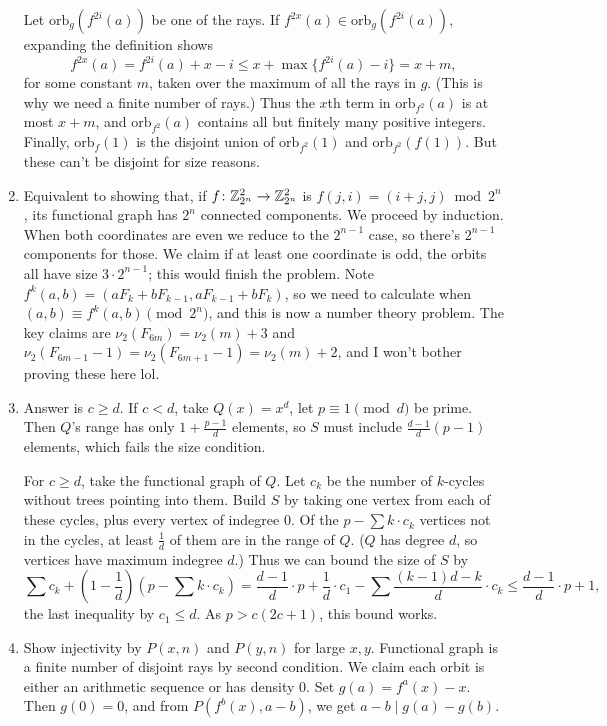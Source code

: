 \documentclass[11pt,paper=letter]{scrartcl}
\newcommand{\orbf}[2]{\mathrm{orb}_{#1}(#2)}
\begin{document}
\begin{enumerate}
Let $\orbf{g}{f^{2i}(a)}$ be one of the rays. If $f^{2x}(a) \in \orbf{g}{f^{2i}(a)}$, expanding the definition shows \[
  f^{2x}(a) = f^{2i}(a) + x - i \le x + \max\{f^{2i}(a) - i\} = x + m,
\]
for some constant $m$, taken over the maximum of all the rays in $g$. (This is why we need a finite number of rays.) Thus the $x$th term in $\orbf{f^2}{a}$ is at most $x + m$, and $\orbf{f^2}{a}$ contains all but finitely many positive integers. Finally, $\orbf{f}{1}$ is the disjoint union of $\orbf{f^2}{1}$ and $\orbf{f^2}{f(1)}$. But these can't be disjoint for size reasons.

\item Equivalent to showing that, if $f \colon \mathbb Z_{2^n}^2 \to \mathbb Z_{2^n}^2$ is $f(j, i) = (i + j, j) \bmod 2^n$, its functional graph has $2^n$ connected components. We proceed by induction. When both coordinates are even we reduce to the $2^{n-1}$ case, so there's $2^{n-1}$ components for those. We claim if at least one coordinate is odd, the orbits all have size $3 \cdot 2^{n-1}$; this would finish the problem. Note $f^k(a, b) = (aF_k + bF_{k-1}, aF_{k-1} + bF_k)$, so we need to calculate when $(a, b) \equiv f^k(a, b) \pmod{2^n}$, and this is now a number theory problem. The key claims are $\nu_2(F_{6m}) = \nu_2(m) + 3$ and $\nu_2(F_{6m-1} - 1) = \nu_2(F_{6m+1} - 1) = \nu_2(m) + 2$, and I won't bother proving these here lol.

\item Answer is $c \ge d$. If $c < d$, take $Q(x) = x^d$, let $p \equiv 1 \pmod d$ be prime. Then $Q$'s range has only $1 + \frac{p-1}{d}$ elements, so $S$ must include $\frac{d-1}{d}(p - 1)$ elements, which fails the size condition.

For $c \ge d$, take the functional graph of $Q$. Let $c_k$ be the number of $k$-cycles without trees pointing into them. Build $S$ by taking one vertex from each of these cycles, plus every vertex of indegree $0$. Of the $p - \sum k \cdot c_k$ vertices not in the cycles, at least $\frac{1}{d}$ of them are in the range of $Q$. ($Q$ has degree $d$, so vertices have maximum indegree $d$.) Thus we can bound the size of $S$ by \[
  \sum c_k + \left(1 - \frac{1}{d}\right)\left(p - \sum k \cdot c_k\right)
  = \frac{d-1}{d} \cdot p + \frac{1}{d} \cdot c_1 - \sum \frac{(k - 1)d - k}{d} \cdot c_k
  \le \frac{d-1}{d} \cdot p + 1,
\]
the last inequality by $c_1 \le d$. As $p > c(2c + 1)$, this bound works.

\item Show injectivity by $P(x, n)$ and $P(y, n)$ for large $x, y$. Functional graph is a finite number of disjoint rays by second condition. We claim each orbit is either an arithmetic sequence or has density $0$. Set $g(a) = f^a(x) - x$. Then $g(0) = 0$, and from $P(f^b(x), a - b)$, we get $a - b \mid g(a) - g(b)$.


\end{enumerate}
\end{document}
